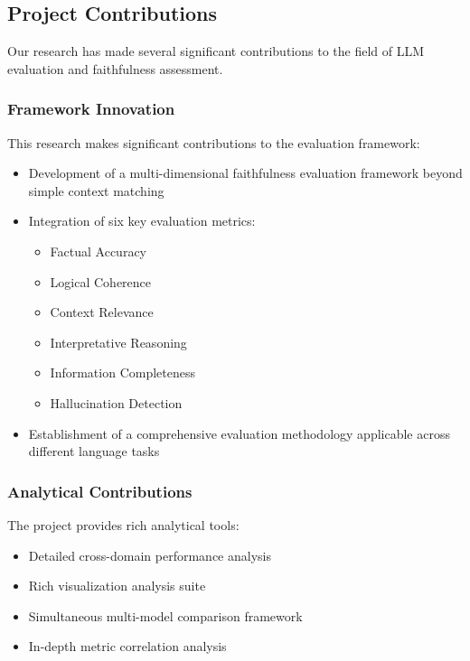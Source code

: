 \vspace{0.5em}
\subsection{Project Contributions}
Our research has made several significant contributions to the field of LLM evaluation and faithfulness assessment.

\vspace{0.5em}
\subsubsection{Framework Innovation}
This research makes significant contributions to the evaluation framework:
\begin{itemize}
    \item Development of a multi-dimensional faithfulness evaluation framework beyond simple context matching
    \item Integration of six key evaluation metrics:
    \begin{itemize}
        \item Factual Accuracy
        \item Logical Coherence
        \item Context Relevance
        \item Interpretative Reasoning
        \item Information Completeness
        \item Hallucination Detection
    \end{itemize}
    \vspace{0.5em}
    \item Establishment of a comprehensive evaluation methodology applicable across different language tasks
\end{itemize}

\vspace{0.5em}
\subsubsection{Analytical Contributions}
The project provides rich analytical tools:
\begin{itemize}
    \item Detailed cross-domain performance analysis
    \item Rich visualization analysis suite
    \item Simultaneous multi-model comparison framework
    \item In-depth metric correlation analysis
\end{itemize}


